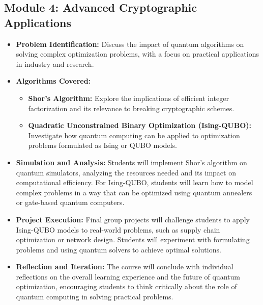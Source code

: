 \subsection{Module 4: Advanced Cryptographic Applications}
\begin{itemize}
    \item \textbf{Problem Identification:} Discuss the impact of quantum algorithms on solving complex optimization problems, with a focus on practical applications in industry and research.
    \item \textbf{Algorithms Covered:}
    \begin{itemize}
        \item \textbf{Shor’s Algorithm:} Explore the implications of efficient integer factorization and its relevance to breaking cryptographic schemes.
        \item \textbf{Quadratic Unconstrained Binary Optimization (Ising-QUBO):} Investigate how quantum computing can be applied to optimization problems formulated as Ising or QUBO models.
    \end{itemize}
    \item \textbf{Simulation and Analysis:} Students will implement Shor’s algorithm on quantum simulators, analyzing the resources needed and its impact on computational efficiency. For Ising-QUBO, students will learn how to model complex problems in a way that can be optimized using quantum annealers or gate-based quantum computers.
    \item \textbf{Project Execution:} Final group projects will challenge students to apply Ising-QUBO models to real-world problems, such as supply chain optimization or network design. Students will experiment with formulating problems and using quantum solvers to achieve optimal solutions.
    \item \textbf{Reflection and Iteration:} The course will conclude with individual reflections on the overall learning experience and the future of quantum optimization, encouraging students to think critically about the role of quantum computing in solving practical problems.
\end{itemize}


